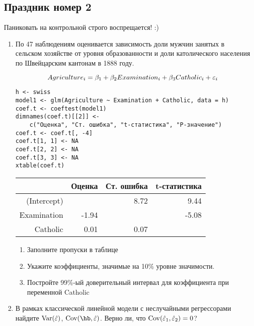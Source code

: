 \documentclass[12pt, a4paper]{article}
\theoremstyle{definition}
\begin{document}
\subsection{Праздник номер 2}


{\Large Паниковать на контрольной строго воспрещается! :)}

\begin{enumerate}

\item  По 47 наблюдениям оценивается зависимость доли мужчин занятых в сельском хозяйстве от уровня образованности и доли католического населения по Швейцарским кантонам в 1888 году.

\[Agriculture_i=\beta_1+\beta_2 Examination_i+\beta_3 Catholic_i+\varepsilon_i\]

\begin{verbatim}
h <- swiss
model1 <- glm(Agriculture ~ Examination + Catholic, data = h)
coef.t <- coeftest(model1)
dimnames(coef.t)[[2]] <-
    c("Оценка", "Ст. ошибка", "t-статистика", "P-значение")
coef.t <- coef.t[, -4]
coef.t[1, 1] <- NA
coef.t[2, 2] <- NA
coef.t[3, 3] <- NA
xtable(coef.t)
\end{verbatim}

\begin{table}[ht]
\centering
\begin{tabular}{rrrr}
  \hline
 & Оценка & Ст. ошибка & t-статистика \\
  \hline
(Intercept) &  & 8.72 & 9.44 \\
  Examination & -1.94 &  & -5.08 \\
  Catholic & 0.01 & 0.07 &  \\
   \hline
\end{tabular}
\end{table}



\begin{enumerate}
\item Заполните пропуски в таблице
\item Укажите коэффициенты, значимые на 10\% уровне значимости.
\item Постройте 99\%-ый доверительный интервал для коэффициента при переменной Catholic
\end{enumerate}

\item В рамках классической линейной модели с неслучайными регрессорами найдите $\operatorname{Var}(\hat{\varepsilon})$, $\Cov(\hb,\hat{\e})$. Верно ли, что $\operatorname{Cov}(\hat{\varepsilon}_1,\hat{\varepsilon}_2)=0$?


\end{enumerate}
\end{document}
